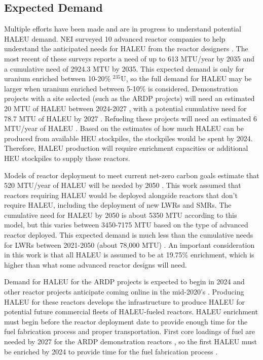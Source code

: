 \subsection{Expected Demand}
Multiple efforts have been made and are in progress to understand
potential \gls{HALEU} demand. \gls{NEI} surveyed 10 advanced reactor 
companies to help understand the anticipated needs
for \gls{HALEU} from the reactor designers 
\cite{korsnick_need_2018,korsnick_updated_2020,korsnick_updated_2021}. 
The most recent of these surveys \cite{korsnick_updated_2021} reports 
a need of up to 613 MTU/year by 2035 and a cumulative need of 2924.3 MTU 
by 2035. This expected demand is only for uranium enriched between 10-20\%
$^{235}$U, so the full demand for \gls{HALEU} may be larger when uranium 
enriched between 5-10\% is considered. Demonstration projects with a site selected 
(such as the \gls{ARDP} projects) will need an estimated 20 MTU of \gls{HALEU} 
between 2024-2027 
\cite{nuclear_energy_institute_establishing_2022}, with a potential cumulative 
need for 78.7 MTU of \gls{HALEU} by 2027 \cite{korsnick_updated_2021}. 
Refueling these projects will need an estimated 6 MTU/year of 
\gls{HALEU} \cite{nuclear_energy_institute_establishing_2022}. Based 
on the estimates of how much \gls{HALEU} can be produced from available 
\gls{HEU} stockpiles, the stockpiles would be spent by 2024. Therefore, 
\gls{HALEU} production will require enrichment capacities or additional 
\gls{HEU} stockpiles to supply these reactors. 

Models of reactor deployment to meet current net-zero carbon goals 
estimate that 520 MTU/year of \gls{HALEU} will be needed by 2050 
\cite{dixon_estimated_2022}. This work assumed that reactors 
requiring \gls{HALEU} would be deployed alongside reactors that don't 
require \gls{HALEU}, including the deployment of new 
\glspl{LWR} and \glspl{SMR}. 
The cumulative need for \gls{HALEU} by 2050 
is about 5350 MTU according to this model, but this varies between 
3450-7175 MTU based on the type of advanced reactor deployed. 
This expected demand is much less than the 
cumulative needs for \glspl{LWR} between 2021-2050 (about 78,000 MTU) 
\cite{dixon_estimated_2022}. An important 
consideration in this work is that all \gls{HALEU} is assumed to be 
at 19.75\% enrichment, which is higher than what some advanced reactor 
designs will need. 

Demand for \gls{HALEU} for the \gls{ARDP} projects is expected to begin in 
2024 and other reactor projects anticipate coming online in the 
mid-2020's \cite{nuclear_energy_institute_establishing_2022}. 
Producing \gls{HALEU} for these reactors develops the infrastructure 
to produce \gls{HALEU} for potential future commercial fleets of 
\gls{HALEU}-fueled reactors. 
\gls{HALEU} enrichment must begin before the reactor deployment 
date to provide enough 
time for the fuel fabrication process and proper transportation. First 
core loadings of fuel are needed by 2027 for the \gls{ARDP} 
demonstration reactors \cite{dixon_estimated_2022}, so the 
first \gls{HALEU} must be enriched by 2024 to provide 
time for the fuel fabrication process 
\cite{nuclear_energy_institute_establishing_2022}. 

